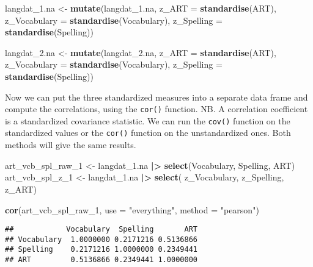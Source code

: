 \documentclass[
]{article}
\newenvironment{Shaded}{\begin{snugshade}}{\end{snugshade}}
\newcommand{\AttributeTok}[1]{\textcolor[rgb]{0.13,0.29,0.53}{#1}}
\newcommand{\FunctionTok}[1]{\textcolor[rgb]{0.13,0.29,0.53}{\textbf{#1}}}
\newcommand{\NormalTok}[1]{#1}
\newcommand{\OtherTok}[1]{\textcolor[rgb]{0.56,0.35,0.01}{#1}}
\newcommand{\SpecialCharTok}[1]{\textcolor[rgb]{0.81,0.36,0.00}{\textbf{#1}}}
\newcommand{\StringTok}[1]{\textcolor[rgb]{0.31,0.60,0.02}{#1}}
\begin{document}
\begin{Shaded}
\begin{Highlighting}[]
\NormalTok{langdat\_1.na }\OtherTok{\textless{}{-}} \FunctionTok{mutate}\NormalTok{(langdat\_1.na, }
                       \AttributeTok{z\_ART =} \FunctionTok{standardise}\NormalTok{(ART), }
                       \AttributeTok{z\_Vocabulary =} \FunctionTok{standardise}\NormalTok{(Vocabulary), }
                       \AttributeTok{z\_Spelling =} \FunctionTok{standardise}\NormalTok{(Spelling))}

\NormalTok{langdat\_2.na }\OtherTok{\textless{}{-}} \FunctionTok{mutate}\NormalTok{(langdat\_2.na, }
                       \AttributeTok{z\_ART =} \FunctionTok{standardise}\NormalTok{(ART), }
                       \AttributeTok{z\_Vocabulary =} \FunctionTok{standardise}\NormalTok{(Vocabulary), }
                       \AttributeTok{z\_Spelling =} \FunctionTok{standardise}\NormalTok{(Spelling))}
\end{Highlighting}
\end{Shaded}

Now we can put the three standardized measures into a separate data
frame and compute the correlations, using the \texttt{cor()} function.
NB. A correlation coefficient is a standardized covariance statistic. We
can run the \texttt{cov()} function on the standardized values or the
\texttt{cor()} function on the unstandardized ones. Both methods will
give the same results.

\begin{Shaded}
\begin{Highlighting}[]
\NormalTok{art\_vcb\_spl\_raw\_1 }\OtherTok{\textless{}{-}}\NormalTok{ langdat\_1.na }\SpecialCharTok{|\textgreater{}} \FunctionTok{select}\NormalTok{(Vocabulary, Spelling, ART)}
\NormalTok{art\_vcb\_spl\_z\_1 }\OtherTok{\textless{}{-}}\NormalTok{ langdat\_1.na }\SpecialCharTok{|\textgreater{}} \FunctionTok{select}\NormalTok{( z\_Vocabulary, z\_Spelling, z\_ART) }

\FunctionTok{cor}\NormalTok{(art\_vcb\_spl\_raw\_1, }\AttributeTok{use =} \StringTok{"everything"}\NormalTok{, }\AttributeTok{method =} \StringTok{"pearson"}\NormalTok{) }
\end{Highlighting}
\end{Shaded}

\begin{verbatim}
##            Vocabulary  Spelling       ART
## Vocabulary  1.0000000 0.2171216 0.5136866
## Spelling    0.2171216 1.0000000 0.2349441
## ART         0.5136866 0.2349441 1.0000000
\end{verbatim}
\end{document}
